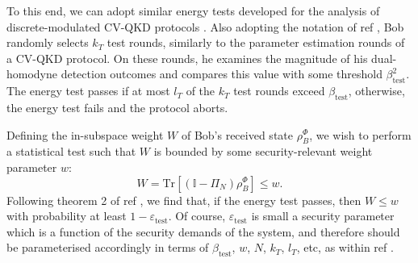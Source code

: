 ﻿\documentclass[12pt]{article}
\begin{document}
To this end, we can adopt similar energy tests developed for the analysis of discrete-modulated CV-QKD protocols \cite{Kanitschar-2023}. Also adopting the notation of ref \cite{Kanitschar-2023}, Bob randomly selects $k_T$ test rounds, similarly to the parameter estimation rounds of a CV-QKD protocol. On these rounds, he examines the magnitude of his dual-homodyne detection outcomes and compares this value with some threshold $\beta_\text{test}^2$. The energy test passes if at most $l_T$ of the $k_T$ test rounds exceed $\beta_\text{test}$, otherwise, the energy test fails and the protocol aborts.

Defining the in-subspace weight $W$ of Bob's received state $\rho_B^\Phi$, we wish to perform a statistical test such that $W$ is bounded by some security-relevant weight parameter $w$: 
\begin{equation}
  \label{eq: W}
  W = \text{Tr} \left[\left(\mathbb{I} - \Pi_N\right) \rho_B^\Phi \right] \leq w.
\end{equation}
Following theorem 2 of ref \cite{Kanitschar-2023}, we find that, if the energy test passes, then $W \leq w$ with probability at least $1 - \varepsilon_\text{test}$. Of course, $\varepsilon_\text{test}$ is small a security parameter which is a function of the security demands of the system, and therefore should be parameterised accordingly in terms of $\beta_\text{test}$, $w$, $N$, $k_T$, $l_T$, etc, as within ref \cite{Kanitschar-2023}.
\end{document}

